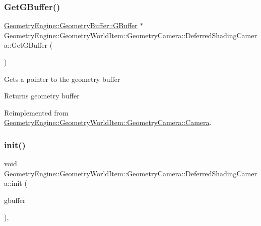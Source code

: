 \subsubsection{\texorpdfstring{GetGBuffer()}{GetGBuffer()}}
{\footnotesize\ttfamily \mbox{\hyperlink{class_geometry_engine_1_1_geometry_buffer_1_1_g_buffer}{Geometry\+Engine\+::\+Geometry\+Buffer\+::\+G\+Buffer}} $\ast$ Geometry\+Engine\+::\+Geometry\+World\+Item\+::\+Geometry\+Camera\+::\+Deferred\+Shading\+Camera\+::\+Get\+G\+Buffer (\begin{DoxyParamCaption}{ }\end{DoxyParamCaption})\hspace{0.3cm}{\ttfamily [virtual]}}

Gets a pointer to the geometry buffer \begin{DoxyReturn}{Returns}
geometry buffer 
\end{DoxyReturn}


Reimplemented from \mbox{\hyperlink{class_geometry_engine_1_1_geometry_world_item_1_1_geometry_camera_1_1_camera_a23673bed2b417962168e0bc5b8b37eb3}{Geometry\+Engine\+::\+Geometry\+World\+Item\+::\+Geometry\+Camera\+::\+Camera}}.

\mbox{\label{class_geometry_engine_1_1_geometry_world_item_1_1_geometry_camera_1_1_deferred_shading_camera_a31f4f7af970df8edd71b15ed56bdc906}} 
\subsubsection{\texorpdfstring{init()}{init()}}
{\footnotesize\ttfamily void Geometry\+Engine\+::\+Geometry\+World\+Item\+::\+Geometry\+Camera\+::\+Deferred\+Shading\+Camera\+::init (\begin{DoxyParamCaption}\item[{const \mbox{\hyperlink{class_geometry_engine_1_1_geometry_render_data_1_1_render_buffers_data}{Geometry\+Render\+Data\+::\+Render\+Buffers\+Data}} \&}]{gbuffer }\end{DoxyParamCaption})\hspace{0.3cm}{\ttfamily [protected]}, {\ttfamily [virtual]}}

